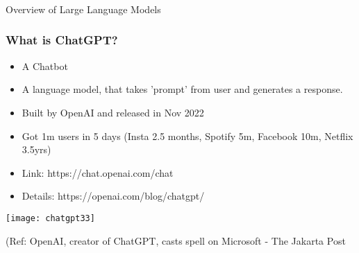\begin{frame}[fragile]\frametitle{}
\begin{center}
{\Large Overview of Large Language Models}
\end{center}
\end{frame}

\begin{frame}[fragile]\frametitle{What is ChatGPT?}


\begin{itemize}
\item A Chatbot
\item A language model, that takes 'prompt' from user and generates a response.
\item Built by OpenAI and released in Nov 2022
\item Got 1m users in 5 days  (Insta 2.5 months, Spotify 5m, Facebook 10m, Netflix 3.5yrs)
\end{itemize}	 

\begin{itemize}
\item Link: https://chat.openai.com/chat
\item Details: https://openai.com/blog/chatgpt/
\end{itemize}	 

\begin{center}
\texttt{[image: chatgpt33]}
\end{center}		
		
{\tiny (Ref: OpenAI, creator of ChatGPT, casts spell on Microsoft
- The Jakarta Post}
			
			
\end{frame}




		
